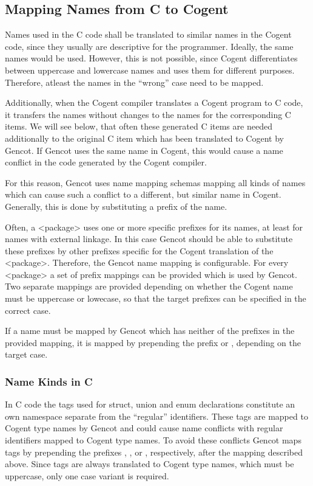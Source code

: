 \subsection{Mapping Names from C to Cogent}
\label{design-names}

Names used in the C code shall be translated to similar names in the Cogent code, since they usually are descriptive for the
programmer. Ideally, the same names would be used. However, this is not possible, since Cogent differentiates between 
uppercase and lowercase names and uses them for different purposes. Therefore, atleast the names in the ``wrong'' case
need to be mapped.

Additionally, when the Cogent compiler translates a Cogent program to C code, it transfers the names without changes to
the names for the corresponding C items. We will see below, that often these generated C items are needed additionally to
the original C item which has been translated to Cogent by Gencot. If Gencot uses the same name in Cogent, this would cause
a name conflict in the code generated by the Cogent compiler.

For this reason, Gencot uses name mapping schemas mapping all kinds of names which can cause such a conflict to a different, but 
similar name in Cogent. Generally, this is done by substituting a prefix of the name.

Often, a <package> uses one or more specific prefixes for its names, at least for names with external linkage. In this case
Gencot should be able to substitute these prefixes by other prefixes specific for the Cogent translation of the <package>.
Therefore, the Gencot name mapping is configurable. For every <package> a set of prefix mappings can be provided which is
used by Gencot. Two separate mappings are provided depending on whether the Cogent name must be uppercase or lowecase, so 
that the target prefixes can be specified in the correct case.

If a name must be mapped by Gencot which has neither of the prefixes in the provided mapping, it is mapped 
by prepending the prefix  or , depending on the target case.

\subsubsection{Name Kinds in C}

In C code the tags used for struct, union and enum declarations constitute an own namespace separate from the ``regular''
identifiers. These tags are mapped to Cogent type names by Gencot and could cause name conflicts with regular identifiers
mapped to Cogent type names. To avoid these conflicts Gencot maps tags by prepending the prefixes , 
, or , respectively, after the mapping described above. Since tags are always translated to Cogent 
type names, which must be uppercase, only one case variant is required.

